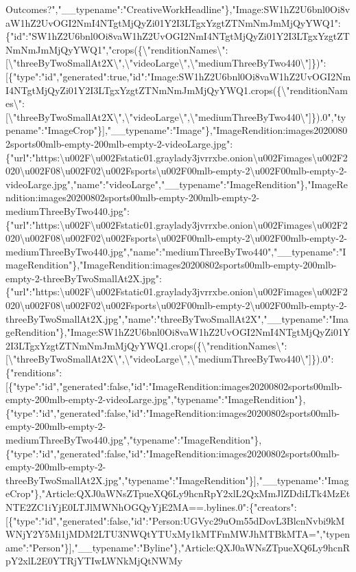 Outcomes?","\_\_typename":"CreativeWorkHeadline"\},"Image:SW1hZ2U6bnl0Oi8vaW1hZ2UvOGI2NmI4NTgtMjQyZi01Y2I3LTgxYzgtZTNmNmJmMjQyYWQ1":\{"id":"SW1hZ2U6bnl0Oi8vaW1hZ2UvOGI2NmI4NTgtMjQyZi01Y2I3LTgxYzgtZTNmNmJmMjQyYWQ1","crops(\{\textbackslash{}"renditionNames\textbackslash{}":{[}\textbackslash{}"threeByTwoSmallAt2X\textbackslash{}",\textbackslash{}"videoLarge\textbackslash{}",\textbackslash{}"mediumThreeByTwo440\textbackslash{}"{]}\})":{[}\{"type":"id","generated":true,"id":"Image:SW1hZ2U6bnl0Oi8vaW1hZ2UvOGI2NmI4NTgtMjQyZi01Y2I3LTgxYzgtZTNmNmJmMjQyYWQ1.crops(\{\textbackslash{}"renditionNames\textbackslash{}":{[}\textbackslash{}"threeByTwoSmallAt2X\textbackslash{}",\textbackslash{}"videoLarge\textbackslash{}",\textbackslash{}"mediumThreeByTwo440\textbackslash{}"{]}\}).0","typename":"ImageCrop"\}{]},"\_\_typename":"Image"\},"ImageRendition:images20200802sports00mlb-empty-200mlb-empty-2-videoLarge.jpg":\{"url":"https:\textbackslash{}u002F\textbackslash{}u002Fstatic01.graylady3jvrrxbe.onion\textbackslash{}u002Fimages\textbackslash{}u002F2020\textbackslash{}u002F08\textbackslash{}u002F02\textbackslash{}u002Fsports\textbackslash{}u002F00mlb-empty-2\textbackslash{}u002F00mlb-empty-2-videoLarge.jpg","name":"videoLarge","\_\_typename":"ImageRendition"\},"ImageRendition:images20200802sports00mlb-empty-200mlb-empty-2-mediumThreeByTwo440.jpg":\{"url":"https:\textbackslash{}u002F\textbackslash{}u002Fstatic01.graylady3jvrrxbe.onion\textbackslash{}u002Fimages\textbackslash{}u002F2020\textbackslash{}u002F08\textbackslash{}u002F02\textbackslash{}u002Fsports\textbackslash{}u002F00mlb-empty-2\textbackslash{}u002F00mlb-empty-2-mediumThreeByTwo440.jpg","name":"mediumThreeByTwo440","\_\_typename":"ImageRendition"\},"ImageRendition:images20200802sports00mlb-empty-200mlb-empty-2-threeByTwoSmallAt2X.jpg":\{"url":"https:\textbackslash{}u002F\textbackslash{}u002Fstatic01.graylady3jvrrxbe.onion\textbackslash{}u002Fimages\textbackslash{}u002F2020\textbackslash{}u002F08\textbackslash{}u002F02\textbackslash{}u002Fsports\textbackslash{}u002F00mlb-empty-2\textbackslash{}u002F00mlb-empty-2-threeByTwoSmallAt2X.jpg","name":"threeByTwoSmallAt2X","\_\_typename":"ImageRendition"\},"Image:SW1hZ2U6bnl0Oi8vaW1hZ2UvOGI2NmI4NTgtMjQyZi01Y2I3LTgxYzgtZTNmNmJmMjQyYWQ1.crops(\{\textbackslash{}"renditionNames\textbackslash{}":{[}\textbackslash{}"threeByTwoSmallAt2X\textbackslash{}",\textbackslash{}"videoLarge\textbackslash{}",\textbackslash{}"mediumThreeByTwo440\textbackslash{}"{]}\}).0":\{"renditions":{[}\{"type":"id","generated":false,"id":"ImageRendition:images20200802sports00mlb-empty-200mlb-empty-2-videoLarge.jpg","typename":"ImageRendition"\},\{"type":"id","generated":false,"id":"ImageRendition:images20200802sports00mlb-empty-200mlb-empty-2-mediumThreeByTwo440.jpg","typename":"ImageRendition"\},\{"type":"id","generated":false,"id":"ImageRendition:images20200802sports00mlb-empty-200mlb-empty-2-threeByTwoSmallAt2X.jpg","typename":"ImageRendition"\}{]},"\_\_typename":"ImageCrop"\},"Article:QXJ0aWNsZTpueXQ6Ly9hcnRpY2xlL2QxMmJlZDdiLTk4MzEtNTE2ZC1iYjE0LTJlMWNhOGQyYjE2MA==.bylines.0":\{"creators":{[}\{"type":"id","generated":false,"id":"Person:UGVyc29uOm55dDovL3BlcnNvbi9kMWNjY2Y5Mi1jMDM2LTU3NWQtYTUxMy1kMTFmMWJhMTBkMTA=","typename":"Person"\}{]},"\_\_typename":"Byline"\},"Article:QXJ0aWNsZTpueXQ6Ly9hcnRpY2xlL2E0YTRjYTIwLWNkMjQtNWMy